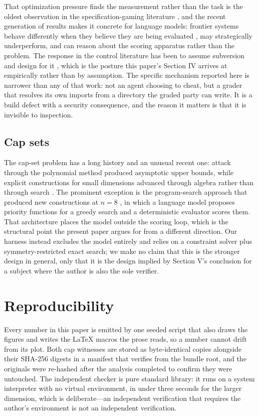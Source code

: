 \documentclass[journal]{IEEEtran}
\begin{document}
That optimization pressure finds the measurement rather than the task is
the oldest observation in the specification-gaming literature
\cite{krakovna2020}, and the recent generation of results makes it
concrete for language models: frontier systems behave differently when
they believe they are being evaluated \cite{meinke2024}, may strategically
underperform, and can reason about the scoring apparatus rather than the
problem. The response in the control literature has been to assume
subversion and design for it \cite{greenblatt2024}, which is the posture
this paper's Section IV arrives at empirically rather than by assumption.
The specific mechanism reported here is narrower than any of that work:
not an agent choosing to cheat, but a grader that resolves its own
imports from a directory the graded party can write. It is a build defect
with a security consequence, and the reason it matters is that it is
invisible to inspection.

\subsection{Cap sets}

The cap-set problem has a long history and an unusual recent one:
attack through the polynomial method produced asymptotic upper bounds,
while explicit constructions for small dimensions advanced through
algebra rather than through search \cite{edel2004,karapetyan2023}. The
prominent exception is the program-search approach that produced new
constructions at $n=8$ \cite{funsearch2023}, in which a language model
proposes priority functions for a greedy search and a deterministic
evaluator scores them. That architecture places the model outside the
scoring loop, which is the structural point the present paper argues for
from a different direction. Our harness instead excludes the model
entirely and relies on a constraint solver plus symmetry-restricted
exact search; we make no claim that this is the stronger design in
general, only that it is the design implied by Section V's conclusion
for a subject where the author is also the sole verifier.

\section{Reproducibility}

Every number in this paper is emitted by one seeded script that also
draws the figures and writes the \LaTeX{} macros the prose reads, so a
number cannot drift from its plot. Both cap witnesses are stored as
byte-identical copies alongside their SHA-256 digests in a manifest that
verifies from the bundle root, and the originals were re-hashed after the
analysis completed to confirm they were untouched. The independent
checker is pure standard library: it runs on a system interpreter with no
virtual environment, in under three seconds for the larger dimension,
which is deliberate---an independent verification that requires the
author's environment is not an independent verification.
\end{document}
